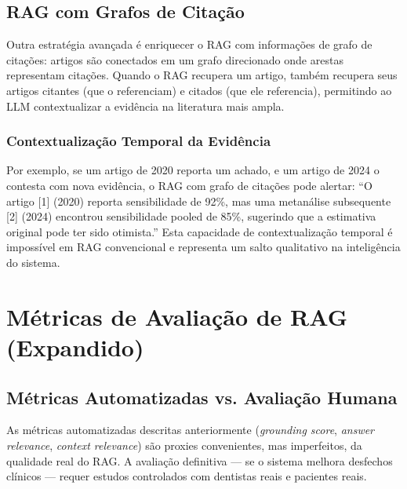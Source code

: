 \subsection{RAG com Grafos de Citação}

Outra estratégia avançada é enriquecer o RAG com informações de grafo de citações: artigos são conectados em um grafo direcionado onde arestas representam citações. Quando o RAG recupera um artigo, também recupera seus artigos citantes (que o referenciam) e citados (que ele referencia), permitindo ao LLM contextualizar a evidência na literatura mais ampla.

\subsubsection{Contextualização Temporal da Evidência}

Por exemplo, se um artigo de 2020 reporta um achado, e um artigo de 2024 o contesta com nova evidência, o RAG com grafo de citações pode alertar: ``O artigo [1] (2020) reporta sensibilidade de 92\%, mas uma metanálise subsequente [2] (2024) encontrou sensibilidade pooled de 85\%, sugerindo que a estimativa original pode ter sido otimista.'' Esta capacidade de contextualização temporal é impossível em RAG convencional e representa um salto qualitativo na inteligência do sistema.


\section{Métricas de Avaliação de RAG (Expandido)}

\subsection{Métricas Automatizadas vs. Avaliação Humana}

As métricas automatizadas descritas anteriormente (\textit{grounding score}, \textit{answer relevance}, \textit{context relevance}) são proxies convenientes, mas imperfeitos, da qualidade real do RAG. A avaliação definitiva --- se o sistema melhora desfechos clínicos --- requer estudos controlados com dentistas reais e pacientes reais.


